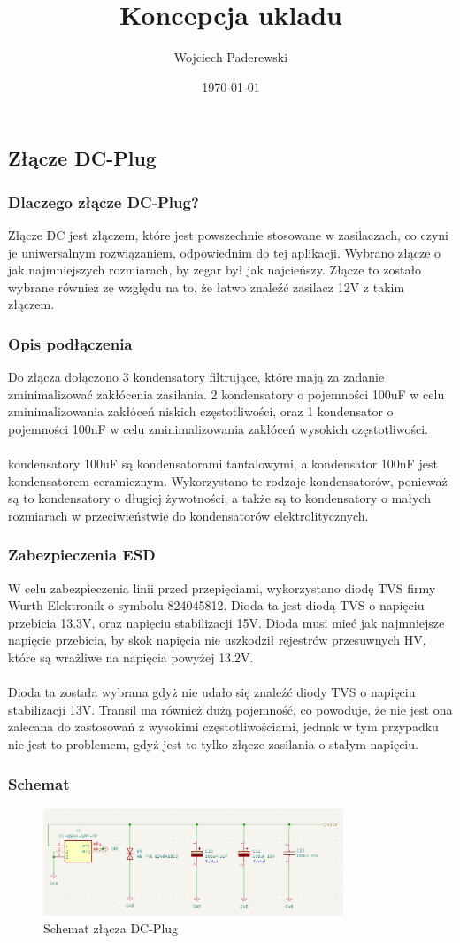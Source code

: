 \documentclass[../../main.tex]{subfiles}
\author{Wojciech Paderewski}
\date{\today}
\title{Koncepcja ukladu}
\begin{document}
\subsection{Złącze DC-Plug}
\subsubsection{Dlaczego złącze DC-Plug?}
Złącze DC jest złączem, które jest powszechnie stosowane w zasilaczach, co czyni je uniwersalnym rozwiązaniem, odpowiednim do tej aplikacji.
Wybrano złącze o jak najmniejszych rozmiarach, by zegar był jak najcieńszy. Złącze to zostało wybrane również ze względu na to, że łatwo znaleźć zasilacz 12V z takim złączem.

\subsubsection{Opis podłączenia}
Do złącza dołączono 3 kondensatory filtrujące, które mają za zadanie zminimalizować zakłócenia zasilania. 2 kondensatory o 
pojemności 100uF w celu zminimalizowania zakłóceń niskich częstotliwości, oraz 1 kondensator o pojemności 100nF w celu zminimalizowania zakłóceń wysokich częstotliwości.
\\\\
kondensatory 100uF są kondensatorami tantalowymi, a kondensator 100nF jest kondensatorem ceramicznym. Wykorzystano te rodzaje kondensatorów, 
ponieważ są to kondensatory o długiej żywotności, a także są to kondensatory o małych rozmiarach w przeciwieństwie do kondensatorów elektrolitycznych.

\subsubsection{Zabezpieczenia ESD}

W celu zabezpieczenia linii przed przepięciami, wykorzystano diodę TVS firmy Wurth Elektronik o symbolu 824045812. Dioda ta jest diodą TVS o napięciu przebicia 13.3V,
oraz napięciu stabilizacji 15V. Dioda musi mieć jak najmniejsze napięcie przebicia, by skok napięcia nie uszkodził rejestrów przesuwnych HV, które są wrażliwe na napięcia powyżej 13.2V.
\\\\
Dioda ta została wybrana gdyż nie udało się znaleźć diody TVS o napięciu stabilizacji 13V. Transil ma również dużą pojemność, co powoduje, że nie jest ona zalecana do 
zastosowań z wysokimi częstotliwościami, jednak w tym przypadku nie jest to problemem, gdyż jest to tylko złącze zasilania o stałym napięciu.

\subsubsection{Schemat}
\begin{figure}[H]
    \centering
    \includegraphics[width=0.8\textwidth]{DcPlug_schemat.png}
    \caption{Schemat złącza DC-Plug}
\end{figure}
\end{document}
